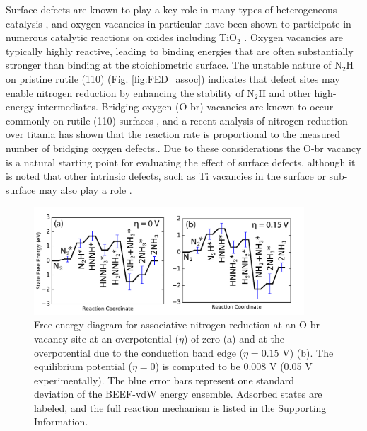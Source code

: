 \documentclass[journal=ascecg,manuscript=article,articletitle=true]{achemso}
\begin{document}
Surface defects are known to play a key role in many types of heterogeneous catalysis \cite{Yates_1991}, and oxygen vacancies in particular have been shown to participate in numerous catalytic reactions on oxides \cite{McFarland_2013} including TiO$_2$ \cite{Kim2016,Kim2014,Diebold2003,Pang2008,Pang_2013}. Oxygen vacancies are typically highly reactive, leading to binding energies that are often substantially stronger than binding at the stoichiometric surface. The unstable nature of N$_2$H on pristine rutile (110) (Fig. \ref{fig:FED_assoc}) indicates that defect sites may enable nitrogen reduction by enhancing the stability of N$_2$H and other high-energy intermediates. Bridging oxygen (O-br) vacancies are known to occur commonly on rutile (110) surfaces \cite{Diebold2003,Pang2008,Pang_2013}, and a recent analysis of nitrogen reduction over titania has shown that the reaction rate is proportional to the measured number of bridging oxygen defects.\cite{Hirakawa_2017}. Due to these considerations the O-br vacancy is a natural starting point for evaluating the effect of surface defects, although it is noted that other intrinsic defects, such as Ti vacancies in the surface or sub-surface may also play a role \cite{Hobiger_1990}.

\begin{figure}
\includegraphics[width=0.9\textwidth]{figures/defect_associative_FED.pdf}
\caption{Free energy diagram for associative nitrogen reduction at an O-br vacancy site at an overpotential ($\eta$) of zero (a) and at the overpotential due to the conduction band edge ($\eta=0.15$ V) (b). The equilibrium potential ($\eta=0$) is computed to be 0.008 V (0.05 V experimentally). The blue error bars represent one standard deviation of the BEEF-vdW energy ensemble. Adsorbed states are labeled, and the full reaction mechanism is listed in the Supporting Information.}
\label{fig:FED_defect_assoc}
\end{figure}
\end{document}
